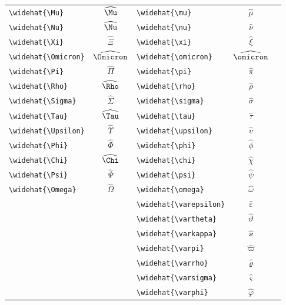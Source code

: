 \documentclass[12pt,a4paper]{article}
\begin{document}
\begin{longtable}{|l|c|l|c|c|}
\verb|\widehat{\Mu}|         & $\widehat{\Mu}$      & \verb|\widehat{\mu}|         & $\widehat{\mu}$         & \\
\verb|\widehat{\Nu}|         & $\widehat{\Nu}$      & \verb|\widehat{\nu}|         & $\widehat{\nu}$         & \\
\verb|\widehat{\Xi}|         & $\widehat{\Xi}$      & \verb|\widehat{\xi}|         & $\widehat{\xi}$         & \\
\verb|\widehat{\Omicron}|    & $\widehat{\Omicron}$ & \verb|\widehat{\omicron}|    & $\widehat{\omicron}$    & \\
\verb|\widehat{\Pi}|         & $\widehat{\Pi}$      & \verb|\widehat{\pi}|         & $\widehat{\pi}$         & \\
\verb|\widehat{\Rho}|        & $\widehat{\Rho}$     & \verb|\widehat{\rho}|        & $\widehat{\rho}$        & \\
\verb|\widehat{\Sigma}|      & $\widehat{\Sigma}$   & \verb|\widehat{\sigma}|      & $\widehat{\sigma}$      & \\
\verb|\widehat{\Tau}|        & $\widehat{\Tau}$     & \verb|\widehat{\tau}|        & $\widehat{\tau}$        & \\
\verb|\widehat{\Upsilon}|    & $\widehat{\Upsilon}$ & \verb|\widehat{\upsilon}|    & $\widehat{\upsilon}$    & \\
\verb|\widehat{\Phi}|        & $\widehat{\Phi}$     & \verb|\widehat{\phi}|        & $\widehat{\phi}$        & \\
\verb|\widehat{\Chi}|        & $\widehat{\Chi}$     & \verb|\widehat{\chi}|        & $\widehat{\chi}$        & \\
\verb|\widehat{\Psi}|        & $\widehat{\Psi}$     & \verb|\widehat{\psi}|        & $\widehat{\psi}$        & \\
\verb|\widehat{\Omega}|      & $\widehat{\Omega}$   & \verb|\widehat{\omega}|      & $\widehat{\omega}$      & \\
                             &                      & \verb|\widehat{\varepsilon}| & $\widehat{\varepsilon}$ & \\
                             &                      & \verb|\widehat{\vartheta}|   & $\widehat{\vartheta}$   & \\
                             &                      & \verb|\widehat{\varkappa}|   & $\widehat{\varkappa}$   & \\
                             &                      & \verb|\widehat{\varpi}|      & $\widehat{\varpi}$      & \\
                             &                      & \verb|\widehat{\varrho}|     & $\widehat{\varrho}$     & \\
                             &                      & \verb|\widehat{\varsigma}|   & $\widehat{\varsigma}$   & \\
                             &                      & \verb|\widehat{\varphi}|     & $\widehat{\varphi}$     & \\
\hline
\end{longtable}
\end{document}
